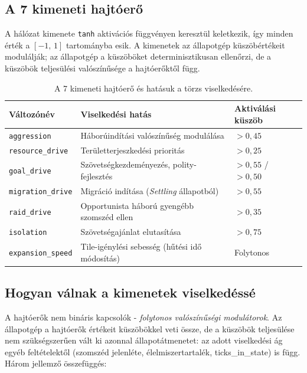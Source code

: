 ﻿\documentclass[a4paper,12pt]{report}
\begin{document}
\subsection*{A 7 kimeneti hajtóerő}

A hálózat kimenete \texttt{tanh} aktivációs függvényen keresztül keletkezik,
így minden érték a \([-1,\,1]\) tartományba esik.
A kimenetek az állapotgép küszöbértékeit modulálják; az állapotgép a küszöböket
determinisztikusan ellenőrzi, de a küszöbök teljesülési valószínűsége a hajtóerőktől függ.

\begin{table}[h]
  \centering
  \caption{A 7 kimeneti hajtóerő és hatásuk a törzs viselkedésére.}
  \label{tab:neurosim-outputs}
  \begin{tabular}{lll}
    \hline
    \textbf{Változónév} & \textbf{Viselkedési hatás} & \textbf{Aktiválási küszöb} \\
    \hline
    \texttt{aggression}      & Háborúindítási valószínűség modulálása       & $> 0{,}45$ \\
    \texttt{resource\_drive} & Területterjeszkedési prioritás                & $> 0{,}25$ \\
    \texttt{goal\_drive}     & Szövetségkezdeményezés, polity-fejlesztés     & $> 0{,}55$ / $> 0{,}50$ \\
    \texttt{migration\_drive}& Migráció indítása (\textit{Settling} állapotból) & $> 0{,}55$ \\
    \texttt{raid\_drive}     & Opportunista háború gyengébb szomszéd ellen  & $> 0{,}35$ \\
    \texttt{isolation}       & Szövetségajánlat elutasítása                 & $> 0{,}75$ \\
    \texttt{expansion\_speed}& Tile-igénylési sebesség (hűtési idő módosítás) & Folytonos \\
    \hline
  \end{tabular}
\end{table}

\subsection*{Hogyan válnak a kimenetek viselkedéssé}

A hajtóerők nem bináris kapcsolók - \textit{folytonos valószínűségi modulátorok}.
Az állapotgép a hajtóerők értékeit küszöbökkel veti össze, de a küszöbök teljesülése
nem szükségszerűen vált ki azonnal állapotátmenetet: az adott viselkedési ág
egyéb feltételektől (szomszéd jelenléte, élelmiszertartalék, ticks\_in\_state)
is függ. Három jellemző összefüggés:
\end{document}
